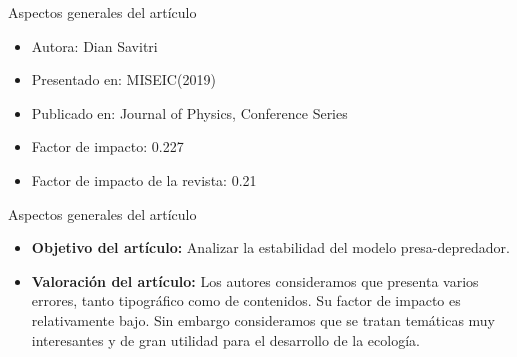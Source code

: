 \documentclass{beamer}
\date{Junio 2023}
\begin{document}
\begin{frame}{}
\end{frame}


\begin{frame}{Aspectos generales del artículo}
    \begin{itemize}


        \item Autora: Dian Savitri\\
        \item Presentado en: MISEIC(2019)\\
        \item Publicado en: Journal of Physics, Conference Series\\
        \item Factor de impacto: 0.227\\
        \item Factor de impacto de la revista: 0.21
    \end{itemize}
\end{frame}
\begin{frame}{Aspectos generales del artículo}
    \begin{itemize}
        \item {\bf Objetivo del artículo:} Analizar la estabilidad del modelo presa-depredador.\\

        \item {\bf Valoración del artículo:} Los autores consideramos que presenta varios errores, tanto tipográfico como de contenidos. Su factor de impacto es
              relativamente bajo. Sin embargo consideramos que se tratan temáticas muy interesantes y de gran utilidad para el desarrollo de la ecología.
    \end{itemize}

\end{frame}
\end{document}
